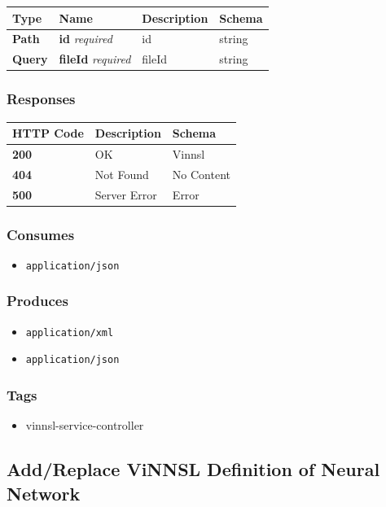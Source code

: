 \begin{longtable}[]{@{}llll@{}}
\toprule
Type & Name & Description & Schema\tabularnewline
\midrule
\endhead
\textbf{Path} & \textbf{id} \emph{required} & id & string\tabularnewline
\textbf{Query} & \textbf{fileId} \emph{required} & fileId &
string\tabularnewline
\bottomrule
\end{longtable}

\subsubsection{Responses}\label{responses-5}

\begin{longtable}[]{@{}lll@{}}
\toprule
HTTP Code & Description & Schema\tabularnewline
\midrule
\endhead
\textbf{200} & OK & Vinnsl\tabularnewline
\textbf{404} & Not Found & No Content\tabularnewline
\textbf{500} & Server Error & Error\tabularnewline
\bottomrule
\end{longtable}

\subsubsection{Consumes}\label{consumes-1}

\begin{itemize}
\tightlist
\item
  \texttt{application/json}
\end{itemize}

\subsubsection{Produces}\label{produces-5}

\begin{itemize}
\tightlist
\item
  \texttt{application/xml}
\item
  \texttt{application/json}
\end{itemize}

\subsubsection{Tags}\label{tags-5}

\begin{itemize}
\tightlist
\item
  vinnsl-service-controller
\end{itemize}

\subsection{Add/Replace ViNNSL Definition of Neural
Network}\label{addreplace-vinnsl-definition-of-neural-network}

